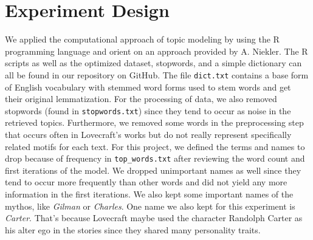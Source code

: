 \section{Experiment Design}

We applied the computational approach of topic modeling by using the R programming language and 
orient on an approach provided by A. Niekler. The R scripts as well as the optimized dataset, 
stopwords, and a simple dictionary can all be found in our repository on GitHub. The file \texttt{dict.txt} 
contains a base form of English vocabulary with stemmed word forms used to stem words and get their 
original lemmatization. For the processing of data, we also removed stopwords (found in \texttt{stopwords.txt}) 
since they tend to occur as noise in the retrieved topics. Furthermore, we removed some words in the 
preprocessing step that occurs often in Lovecraft's works but do not really represent specifically 
related motifs for each text. For this project, we defined the terms and names to drop because of 
frequency in \texttt{top\_words.txt} after reviewing the word count and first iterations of the model. We 
dropped unimportant names as well since they tend to occur more frequently than other words and 
did not yield any more information in the first iterations. We also kept some important names of the 
mythos, like \textit{Gilman} or \textit{Charles}. One name we also kept for this experiment 
is \textit{Carter}. That's because Lovecraft maybe used the character Randolph Carter as his alter ego in 
the stories since they shared many personality traits.\\


